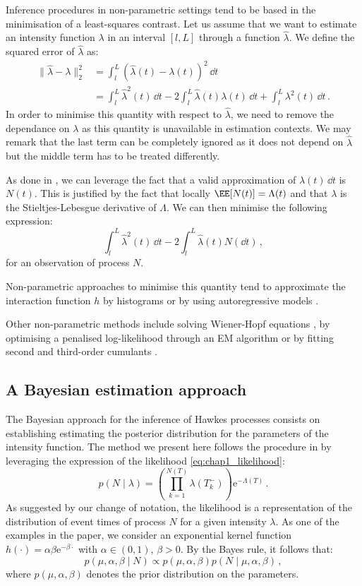 Inference procedures in non-parametric settings tend to be based in the minimisation of a least-squares contrast.
Let us assume that we want to estimate an intensity function $\lambda$ in an interval $[l, L]$ through a function $\hat \lambda$.
We define the squared error of $\hat \lambda$ as:
\begin{align}
    \|\hat \lambda - \lambda\|_2^2 &= \int_{l}^{L}{(\hat \lambda(t) - \lambda(t))^2\,\dd t}\\
    &= \int_{l}^{L}{\hat \lambda^2(t)\,\dd t} - 2\int_{l}^{L}{\hat \lambda(t)\lambda(t)\,\dd t} + \int_{l}^{L}{\lambda^2(t)\,\dd t}\,.
\end{align}
In order to minimise this quantity with respect to $\hat \lambda$, we need to remove the dependance on $\lambda$ as this quantity is unavailable in estimation contexts.
We may remark that the last term can be completely ignored as it does not depend on $\hat \lambda$ but the middle term has to be treated differently.

As done in \textcite{Reynaud2014}, we can leverage the fact that a valid approximation of $\lambda(t)\,\dd t$ is $N(t)$. 
This is justified by the fact that locally $\EE[N(t)] = \Lambda(t)$ and that $\lambda$ is the Stieltjes-Lebesgue derivative of $\Lambda$.
We can then minimise the following expression:
\[\int_{l}^{L}{\hat \lambda^2(t)\,\dd t} - 2\int_{l}^{L}{\hat \lambda(t)N(\dd t)}\,,\]
for an observation of process $N$.

Non-parametric approaches to minimise this quantity tend to approximate the interaction function $h$ by histograms \parencite{Lemonnier2014, Reynaud2014} or by using autoregressive models \parencite{Kirchner2017}.

Other non-parametric methods include solving Wiener-Hopf equations \parencite{Bacry2016}, by optimising a penalised log-likelihood through an EM algorithm \parencite{Lewis2011} or by fitting second and third-order cumulants \parencite{Achab2016}. 

\subsection{A Bayesian estimation approach}

The Bayesian approach for the inference of Hawkes processes consists on establishing estimating the posterior distribution for the parameters of the intensity function.
The method we present here follows the procedure in \textcite{Rasmussen2013} by leveraging the expression of the likelihood \eqref{eq:chap1_likelihood}:
\[p(N\mid \lambda) = \left(\prod_{k=1}^{N(T)}{\lambda(T_k^-)}\right)\mathrm{e}^{-\Lambda(T)}\,.\] 
As suggested by our change of notation, the likelihood is a representation of the distribution of event times of process $N$ for a given intensity $\lambda$.
As one of the examples in the paper, we consider an exponential kernel function $h(\cdot) = \alpha \beta \mathrm{e}^{-\beta \cdot}$ with $\alpha \in(0,1)$, $\beta > 0$.
By the Bayes rule, it follows that:
\[p(\mu, \alpha, \beta \mid N) \propto p(\mu, \alpha, \beta) p(N\mid \mu, \alpha, \beta)\,,\]
where $p(\mu, \alpha, \beta)$ denotes the prior distribution on the parameters.

